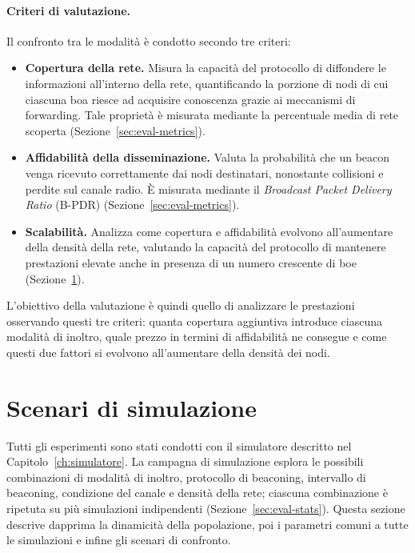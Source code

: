 \paragraph{Criteri di valutazione.} Il confronto tra le modalità è condotto secondo tre criteri:
\begin{itemize}[leftmargin=1.4em,nosep]
  \item \textbf{Copertura della rete.} Misura la capacit\`a del protocollo di
  diffondere le informazioni all'interno della rete, quantificando la porzione
  di nodi di cui ciascuna boa riesce ad acquisire conoscenza grazie ai
  meccanismi di forwarding. Tale propriet\`a \`e misurata mediante la
  percentuale media di rete scoperta (Sezione~\ref{sec:eval-metrics}).
  \item \textbf{Affidabilit\`a della disseminazione.} Valuta la probabilit\`a
  che un beacon venga ricevuto correttamente dai nodi destinatari, nonostante
  collisioni e perdite sul canale radio. \`E misurata mediante il
  \emph{Broadcast Packet Delivery Ratio} (B-PDR) (Sezione~\ref{sec:eval-metrics}).
  \item \textbf{Scalabilit\`a.} Analizza come copertura e affidabilit\`a
  evolvono all'aumentare della densit\`a della rete, valutando la capacit\`a
  del protocollo di mantenere prestazioni elevate anche in presenza di un
  numero crescente di boe (Sezione~\ref{sec:eval-setup}).
\end{itemize}
L'obiettivo della valutazione \`e quindi quello di analizzare le prestazioni osservando questi
tre criteri: quanta copertura aggiuntiva introduce ciascuna modalit\`a di inoltro,
quale prezzo in termini di affidabilit\`a ne consegue e come questi due fattori si
evolvono all'aumentare della densit\`a dei nodi.

\section{Scenari di simulazione}
\label{sec:eval-setup}
Tutti gli esperimenti sono stati condotti con il simulatore descritto nel
Capitolo~\ref{ch:simulatore}. La campagna di simulazione esplora le possibili combinazioni di
modalit\`a di inoltro, protocollo di beaconing, intervallo di beaconing,
condizione del canale e densit\`a della rete; ciascuna combinazione \`e ripetuta
su pi\`u simulazioni indipendenti (Sezione~\ref{sec:eval-stats}). 
Questa sezione descrive dapprima la dinamicit\`a della popolazione, poi i parametri comuni a
tutte le simulazioni e infine gli scenari di confronto.

